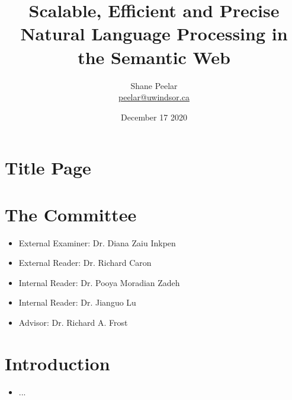 \documentclass[logoontitle,tabu,supertabular,aspectratio=43]{preney-uwindsor-beamer}
\title{Scalable, Efficient and Precise Natural Language Processing in the Semantic Web}
\date[December 17 2020]{December 17 2020}
\author[]{\small Shane Peelar \texorpdfstring{\\}{} {\scriptsize\href{mailto:\emailshane}{peelar@uwindsor.ca}}}
\begin{document}
	\tabulinesep=1pt

	\section*{Title Page}
	\begin{frame}
	\titlepage
	\end{frame}

    \section{The Committee} %
    \begin{frame}{\insertsection}
        \begin{itemize}
            \item External Examiner: Dr. Diana Zaiu Inkpen %
            \item External Reader: Dr. Richard Caron
            \item Internal Reader: Dr. Pooya Moradian Zadeh
            \item Internal Reader: Dr. Jianguo Lu
            \item Advisor: Dr. Richard A. Frost
        \end{itemize}
    \end{frame}

	\section{Introduction}
	\begin{frame}{\insertsection}
		\begin{itemize}
			\item ...
		\end{itemize}
	\end{frame}

\end{document}
